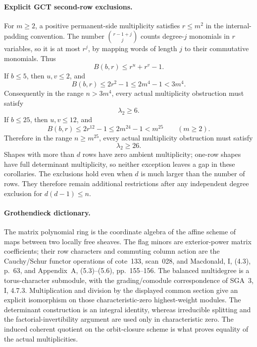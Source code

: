 \paragraph{Explicit GCT second-row exclusions.}
For \(m\geq2\), a positive permanent-side multiplicity satisfies
\(r\leq m^2\) in the internal-padding convention.
The number \(\binom{r-1+j}{j}\) counts degree-\(j\) monomials
in \(r\) variables, so it is at most \(r^j\), by mapping
words of length \(j\) to their commutative monomials.
Thus
\[
                         B(b,r)\leq r^u+r^v-1.
\]
If \(b\leq5\), then \(u,v\leq2\), and
\[
               B(b,r)\leq2r^2-1\leq2m^4-1<3m^4.
\]
Consequently in the range \(n>3m^4\), every actual multiplicity
obstruction must satisfy
\begin{equation}\label{eq:F014IP}
                              \lambda_2\geq6.
\end{equation}
If \(b\leq25\), then \(u,v\leq12\), and
\[
 B(b,r)\leq2r^{12}-1\leq2m^{24}-1<m^{25}
                                           \qquad(m\geq2).
\]
Therefore in the range \(n\geq m^{25}\), every actual
multiplicity obstruction must satisfy
\begin{equation}\label{eq:F014BIP}
                              \lambda_2\geq26.
\end{equation}
Shapes with more than \(d\) rows have zero ambient multiplicity;
one-row shapes have full determinant multiplicity, so neither
exception leaves a gap in these corollaries.
The exclusions hold even when \(d\) is much larger than the
number of rows. They therefore remain additional restrictions
after any independent degree exclusion for \(d(d-1)\leq n\).

\paragraph{Grothendieck dictionary.}
The matrix polynomial ring is the coordinate algebra of the
affine scheme of maps between two locally free sheaves. The
flag minors are exterior-power matrix coefficients; their row
characters and commuting column action are the Cauchy/Schur
functor operations of cote~133, scan~028, and Macdonald, I,
(4.3), p.~63, and Appendix~A, (5.3)--(5.6), pp.~155--156.
The balanced multidegree is a torus-character submodule, with
the grading/comodule correspondence of SGA~3, I, 4.7.3.
Multiplication and division by the displayed common section
give an explicit isomorphism on those characteristic-zero
highest-weight modules. The determinant construction is an
integral identity, whereas irreducible splitting and the
factorial-invertibility argument are used only in characteristic
zero. The induced coherent quotient on the orbit-closure scheme
is what proves equality of the actual multiplicities.
